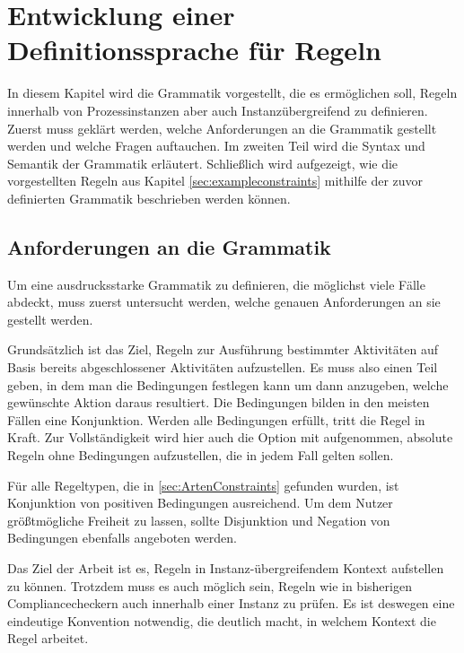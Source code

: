 
\chapter{Entwicklung einer Definitionssprache für Regeln} %

\label{GrammatikKapitel} %


In diesem Kapitel wird die Grammatik vorgestellt, die es ermöglichen soll, Regeln innerhalb von Prozessinstanzen aber auch Instanzübergreifend zu definieren. Zuerst muss geklärt werden, welche Anforderungen an die Grammatik gestellt werden und welche Fragen auftauchen. Im zweiten Teil wird die Syntax und Semantik der Grammatik erläutert. Schließlich wird aufgezeigt, wie die vorgestellten Regeln aus Kapitel \ref{sec:exampleconstraints} mithilfe der zuvor definierten Grammatik beschrieben werden können.

%
%
\section{Anforderungen an die Grammatik}
Um eine ausdrucksstarke Grammatik zu definieren, die möglichst viele Fälle abdeckt, muss zuerst untersucht werden, welche genauen Anforderungen an sie gestellt werden.

Grundsätzlich ist das Ziel, Regeln zur Ausführung bestimmter Aktivitäten auf Basis bereits abgeschlossener Aktivitäten aufzustellen. Es muss also einen Teil geben, in dem man die Bedingungen festlegen kann um dann anzugeben, welche gewünschte Aktion daraus resultiert. Die Bedingungen bilden in den meisten Fällen eine Konjunktion. Werden alle Bedingungen erfüllt, tritt die Regel in Kraft. Zur Vollständigkeit wird hier auch die Option mit aufgenommen, absolute Regeln ohne Bedingungen aufzustellen, die in jedem Fall gelten sollen.

Für alle Regeltypen, die in \ref{sec:ArtenConstraints} gefunden wurden, ist Konjunktion von positiven Bedingungen ausreichend. Um dem Nutzer größtmögliche Freiheit zu lassen, sollte Disjunktion und Negation von Bedingungen ebenfalls angeboten werden.

Das Ziel der Arbeit ist es, Regeln in Instanz-übergreifendem Kontext aufstellen zu können. Trotzdem muss es auch möglich sein, Regeln wie in bisherigen Compliancecheckern auch innerhalb einer Instanz zu prüfen. Es ist deswegen eine eindeutige Konvention notwendig, die deutlich macht, in welchem Kontext die Regel arbeitet.

